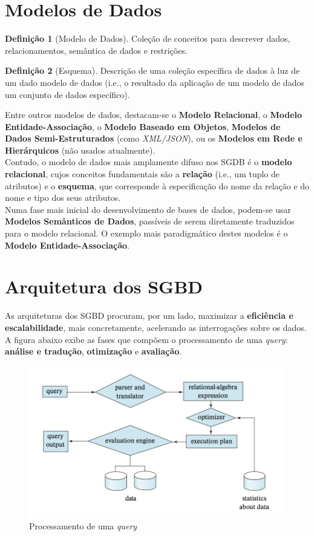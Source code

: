 \documentclass[titlepage]{book}
\theoremstyle{definition}
\newtheorem{definition}{Definição}
\begin{document}
\section{Modelos de Dados}

\begin{definition}[Modelo de Dados]
    Coleção de conceitos para descrever dados, relacionamentos, semântica de dados e restrições.
\end{definition}
\begin{definition}[Esquema]
    Descrição de uma coleção específica de dados à luz de um dado modelo de dados (i.e., o resultado da aplicação de um modelo de dados um conjunto de dados específico).
\end{definition}

Entre outros modelos de dados, destacam-se o \textbf{Modelo Relacional}, o \textbf{Modelo Entidade-Associação}, o \textbf{Modelo Baseado em Objetos}, \textbf{Modelos de Dados Semi-Estruturados} (como \textit{XML/JSON}), ou os \textbf{Modelos em Rede e Hierárquicos} (não usados atualmente).\\
\indent Contudo, o modelo de dados mais amplamente difuso nos SGDB é o \textbf{modelo relacional}, cujos conceitos fundamentais são a \textbf{relação} (i.e., um tuplo de atributos) e o \textbf{esquema}, que corresponde à especificação do nome da relação e do nome e tipo dos seus atributos. \\
\indent Numa fase mais inicial do desenvolvimento de bases de dados, podem-se usar \textbf{Modelos Semânticos de Dados}, passíveis de serem diretamente traduzidos para o modelo relacional. O exemplo mais paradigmático destes modelos é o \textbf{Modelo Entidade-Associação}.

\section{Arquitetura dos SGBD}

As arquiteturas dos SGBD procuram, por um lado, maximizar a \textbf{eficiência e escalabilidade}, mais concretamente, acelerando as interrogações sobre os dados. A figura abaixo exibe as fases que compõem o processamento de uma \textit{query}: \textbf{análise e tradução}, \textbf{otimização} e  \textbf{avaliação}.

\begin{figure}[H]
    \centering
    \includegraphics[scale = 0.5]{cap1/arquitetura.png}
    \caption{Processamento de uma \textit{query}}
\end{figure}
\end{document}
